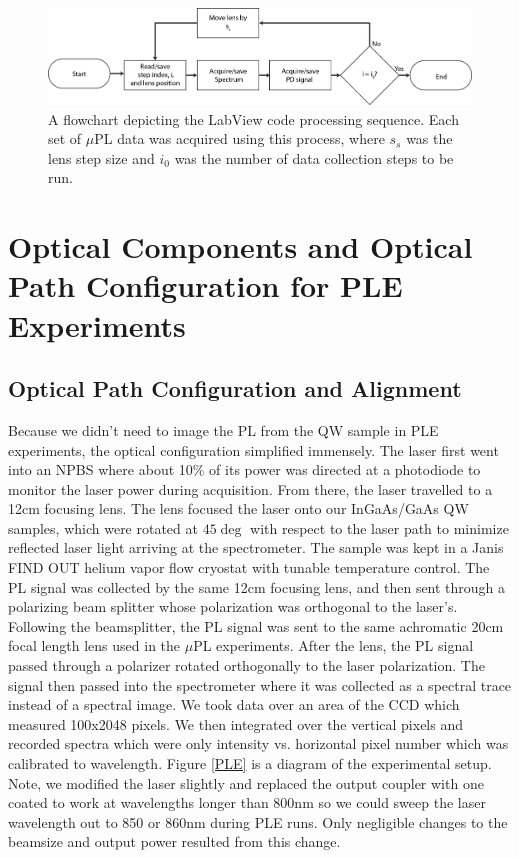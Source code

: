 \begin{figure}[t]
\centering
\includegraphics[width = 1\textwidth]{softflow.png}
\caption{ \doublespacing A flowchart depicting the LabView code processing sequence. Each set of $\mu$PL data was acquired using this process, where $s_s$ was the lens step size and $i_0$ was the number of data collection steps to be run.}
\label{flowit}
\end{figure}

\section{Optical Components and Optical Path Configuration for PLE Experiments}
\subsection{Optical Path Configuration and Alignment}
Because we didn't need to image the PL from the QW sample in PLE experiments, the optical configuration simplified immensely. The laser first went into an NPBS where about 10\% of its power was directed at a photodiode to monitor the laser power during acquisition. From there, the laser travelled to a 12cm focusing lens. The lens focused the laser onto our InGaAs/GaAs QW samples, which were rotated at $45\deg$ with respect to the laser path to minimize reflected laser light arriving at the spectrometer. The sample was kept in a Janis FIND OUT helium vapor flow cryostat with tunable temperature control. The PL signal was collected by the same 12cm focusing lens, and then sent through a polarizing beam splitter whose polarization was orthogonal to the laser's. Following the beamsplitter, the PL signal was sent to the same achromatic 20cm focal length lens used in the $\mu$PL experiments. After the lens, the PL signal passed through a polarizer rotated orthogonally to the laser polarization. The signal then passed into the spectrometer where it was collected as a spectral trace instead of a spectral image. We took data over an area of the CCD which measured 100x2048 pixels. We then integrated over the vertical pixels and recorded spectra which were only intensity vs. horizontal pixel number which was calibrated to wavelength. Figure \ref{PLE} is a diagram of the experimental setup. Note, we modified the laser slightly and replaced the output coupler with one coated to work at wavelengths longer than 800nm so we could sweep the laser wavelength out to 850 or 860nm during PLE runs. Only negligible changes to the beamsize and output power resulted from this change.

